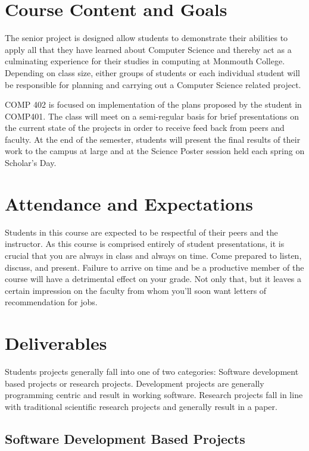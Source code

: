 \documentclass[10pt]{article}
\begin{document}
\section{Course Content and Goals}

The senior project is designed allow students to demonstrate their abilities to apply all that they have learned about Computer Science and thereby act as a culminating experience for their studies in computing at Monmouth College.  Depending on class size, either groups of students or each individual student will be responsible for planning and carrying out a Computer Science related project.  

COMP 402 is focused on implementation of the plans proposed by the student in COMP401.  The class will meet on a semi-regular basis for  brief presentations on the current state of the projects in order to receive feed back from peers and faculty.  At the end of the semester, students will present the final results of their work to the campus at large and at the Science Poster session held each spring on Scholar's Day.

\section{Attendance and Expectations}

Students in this course are expected to be respectful of their peers and the instructor. As this course is comprised entirely of student presentations, it is crucial that you are always in class and always on time.  Come prepared to listen, discuss, and present.  Failure to arrive on time and be a productive member of the course will have a detrimental effect on your grade.  Not only that, but it leaves a certain impression on the faculty from whom you'll soon want letters of recommendation for jobs.  


\section{Deliverables}

Students projects generally fall into one of two categories: Software development based projects or research projects.  Development projects are generally programming centric and result in working software.  Research projects fall in line with traditional scientific research projects and generally result in a paper. 

\subsection{Software Development Based Projects}
\end{document}
